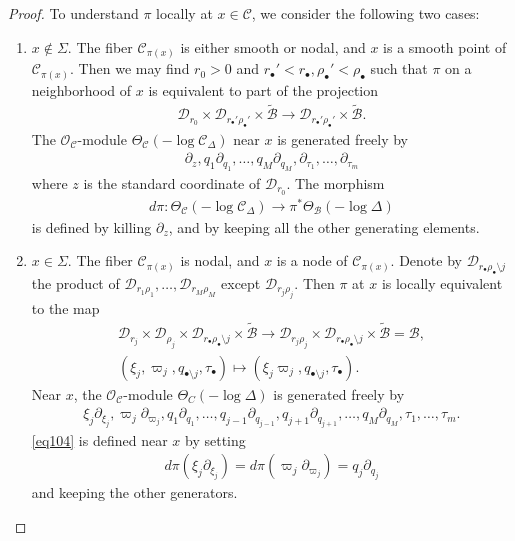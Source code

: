 \documentclass[12pt,a4paper,notitlepage]{article}
\theoremstyle{definition}
\theoremstyle{plain}
\newcommand{\mc}{\mathcal}
\newcommand{\wtd}{\widetilde}
\newcommand{\scr}{\mathscr}
\newcommand{\blt}{\bullet}
\numberwithin{equation}{section}
\begin{document}
\begin{proof}
To understand $\pi$ locally at $x\in\mc C$, we consider the following two cases:
\begin{enumerate}
\item $x\notin\Sigma$. The fiber $\mc C_{\pi(x)}$ is either smooth or nodal, and $x$ is a smooth point of $\mc C_{\pi(x)}$. Then we may find $r_0>0$ and $r_\blt'<r_\blt,\rho_\blt'<\rho_\blt$ such that $\pi$ on a neighborhood of $x$ is equivalent to part of the projection
\begin{align*}
\mc D_{r_0}\times\mc D_{r_\blt'\rho_\blt'}\times\wtd{\mc B}	\rightarrow\mc D_{r_\blt'\rho_\blt'}\times\wtd{\mc B}.
\end{align*}
The $\scr O_{\mc C}$-module $\Theta_{\mc C}(-\log\mc C_\Delta)$ near $x$ is generated freely by
\begin{align*}
\partial_z,q_1\partial_{q_1},\dots,q_M\partial_{q_M},\partial_{\tau_1},\dots,\partial_{\tau_m}	
\end{align*}
where $z$ is the standard coordinate of $\mc D_{r_0}$. The morphism
\begin{align}
	d\pi:\Theta_{\mc C}(-\log\mc C_\Delta)\rightarrow \pi^*\Theta_{\mc B}(-\log\Delta)\label{eq104}
\end{align}
is defined by killing $\partial_z$, and by keeping all the other generating elements.

\item $x\in\Sigma$. The fiber $\mc C_{\pi(x)}$ is nodal, and $x$ is a node of $\mc C_{\pi(x)}$. Denote by $\mc D_{r_\blt\rho_\blt\setminus j}$ the product of $\mc D_{r_1\rho_1},\dots,\mc D_{r_M\rho_M}$ except $\mc D_{r_j\rho_j}$.  Then $\pi$ at $x$ is locally equivalent to the map
\begin{gather*}
\mc D_{r_j}\times\mc D_{\rho_j}\times\mc D_{r_\blt\rho_\blt\setminus j}\times\wtd{\mc B}\rightarrow \mc D_{r_j\rho_j}\times\mc D_{r_\blt\rho_\blt\setminus j}\times\wtd{\mc B}=\mc B,\\
(\xi_j,\varpi_j,q_{\blt\setminus j},\tau_\blt)\mapsto (\xi_j\varpi_j,q_{\blt\setminus j},\tau_\blt).
\end{gather*}
Near $x$, the $\scr O_{\mc C}$-module $\Theta_C(-\log\Delta)$ is generated freely by
\begin{align*}
\xi_j\partial_{\xi_j},\varpi_j\partial_{\varpi_j},q_1\partial_{q_1},\dots,q_{j-1}\partial_{q_{j-1}},q_{j+1}\partial_{q_{j+1}},\dots,q_M\partial_{q_M},\tau_1,\dots,\tau_m.
\end{align*}
\eqref{eq104} is defined near $x$ by setting
\begin{align}
d\pi(\xi_j\partial_{\xi_j})=d\pi(\varpi_j\partial_{\varpi_j})=q_j\partial_{q_j}\label{eq106}
\end{align}
and keeping the other generators.
\end{enumerate}



\end{proof}
\end{document}
